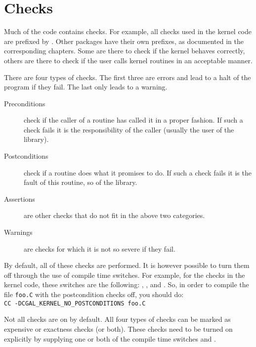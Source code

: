 

\chapter{Checks}

Much of the {\cgal} code contains checks. 
For example, all checks used in the kernel code are prefixed by 
.
Other packages have their own prefixes, as documented in the corresponding
chapters.
Some are there to check if the kernel behaves correctly, others are there to 
check if the user calls kernel routines in an acceptable manner.

There are four types of checks. 
The first three are errors and lead to a halt of the program if they fail. 
The last only leads to a warning.
\begin{description}
\item[Preconditions] check if the caller of a routine has called it in a
proper fashion. 
If such a check fails it is the responsibility of the caller 
(usually the user of the library).
\item[Postconditions] check if a routine does what it promises to do. 
If such a check fails it is the fault of this routine, so of the library.
\item[Assertions] are other checks that do not fit in the above two 
categories.
\item[Warnings] are checks for which it is not so severe if they fail.
\end{description}

By default, all of these checks are performed. 
It is however possible to turn them off through the use of compile time 
switches.
For example, for the checks in the kernel code, these switches are the 
following:
, 
,
 and 
.
So, in order to compile the file \verb~foo.C~ with the postcondition checks
off, you should do:\\
\verb~CC -DCGAL_KERNEL_NO_POSTCONDITIONS foo.C~

Not all checks are on by default.
All four types of checks can be marked as expensive or exactness checks
(or both).
These checks need to be turned on explicitly by supplying one or both of
the compile time switches  and 
.

